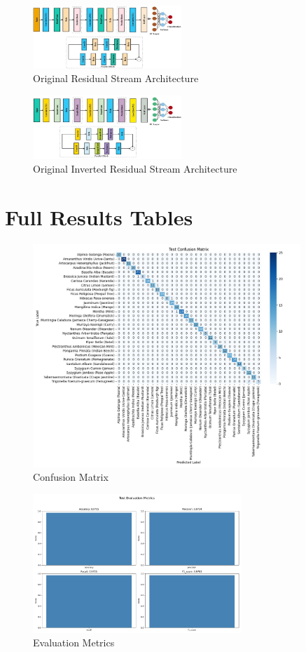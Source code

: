 \documentclass[journal,onecolumn]{IEEEtran}
\begin{document}
\begin{figure}[H]
  \centering
  \includegraphics[width=0.5\textwidth]{figs/1-s2.0-S2405844025007650-fig.003.jpg}
  \caption{Original Residual Stream Architecture}
  \label{fig:original_residual_stream}
\end{figure}

\begin{figure}[H]
  \centering
  \includegraphics[width=0.5\textwidth]{figs/1-s2.0-S2405844025007650-fig.004.jpg}
  \caption{Original Inverted Residual Stream Architecture}
  \label{fig:original_inverted_residual_stream}
\end{figure}

\section{Full Results Tables}
\begin{figure}[H]
  \centering
  \includegraphics[width=0.9\textwidth]{figs/confussion_matrix.png}
  \caption{Confusion Matrix}
  \label{fig:confussion_matrix}
\end{figure}

\begin{figure}[H]
  \centering
  \includegraphics[width=0.7\textwidth]{figs/metrics.png}
  \caption{Evaluation Metrics}
  \label{fig:evaluation_metrics}
\end{figure}
\end{document}

